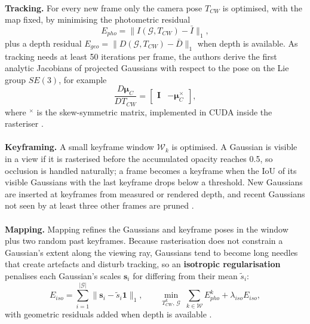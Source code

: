 \documentclass[12pt,a4paper,final]{extreport}
\begin{document}
\paragraph{} \textbf{Tracking.} For every new frame only the camera pose $T_{CW}$ is optimised, with the map fixed, by minimising the photometric residual
\begin{equation}
E_{pho}=\big\|I(\mathcal{G},T_{CW})-\bar{I}\big\|_1,
\end{equation}
plus a depth residual $E_{geo}=\|D(\mathcal{G},T_{CW})-\bar{D}\|_1$ when depth is available. As tracking needs at least 50 iterations per frame, the authors derive the first analytic Jacobians of projected Gaussians with respect to the pose on the Lie group $SE(3)$, for example
\begin{equation}
\frac{D\boldsymbol{\mu}_C}{DT_{CW}}=\begin{bmatrix}\mathbf{I} & -\boldsymbol{\mu}_C^{\times}\end{bmatrix},
\end{equation}
where $^{\times}$ is the skew-symmetric matrix, implemented in CUDA inside the rasteriser \cite{p3}.

\paragraph{} \textbf{Keyframing.} A small keyframe window $\mathcal{W}_k$ is optimised. A Gaussian is visible in a view if it is rasterised before the accumulated opacity reaches 0.5, so occlusion is handled naturally; a frame becomes a keyframe when the IoU of its visible Gaussians with the last keyframe drops below a threshold. New Gaussians are inserted at keyframes from measured or rendered depth, and recent Gaussians not seen by at least three other frames are pruned \cite{p3}.

\paragraph{} \textbf{Mapping.} Mapping refines the Gaussians and keyframe poses in the window plus two random past keyframes. Because rasterisation does not constrain a Gaussian's extent along the viewing ray, Gaussians tend to become long needles that create artefacts and disturb tracking, so an \textbf{isotropic regularisation} penalises each Gaussian's scales $\mathbf{s}_i$ for differing from their mean $\tilde{s}_i$:
\begin{equation}
E_{iso}=\sum_{i=1}^{|\mathcal{G}|}\big\|\mathbf{s}_i-\tilde{s}_i\mathbf{1}\big\|_1,\qquad \min_{T^{k}_{CW},\,\mathcal{G}}\;\sum_{k\in\mathcal{W}}E^{k}_{pho}+\lambda_{iso}E_{iso},
\end{equation}
with geometric residuals added when depth is available \cite{p3}.
\end{document}
